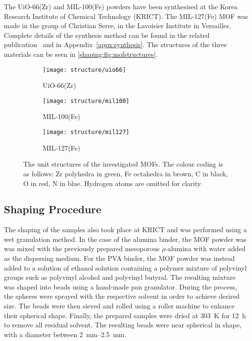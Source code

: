 The UiO-66(Zr) and MIL-100(Fe) powders have been synthesised at the
Korea Research Institute of Chemical Technology (KRICT).
The MIL-127(Fe) MOF was made in the group of Christian Serre,
in the Lavoisier Institute in Versailles.
Complete details of the synthesis method can be found in the related
publication~\cite{valekarShapingPorousMetal2017}
and in Appendix~\ref{appx:synthesis}.
The structures of the three materials can be seen
in \autoref{shaping:fig:mofstructures}.

\begin{figure}[htb]
	\centering
	\begin{subfigure}[b]{0.3\textwidth}
		\texttt{[image: structure/uio66]}
		\caption{UiO-66(Zr)}
	\end{subfigure}%
	\begin{subfigure}[b]{0.3\textwidth}
		\texttt{[image: structure/mil100]}
		\caption{MIL-100(Fe)}
	\end{subfigure}%
	\begin{subfigure}[b]{0.3\textwidth}
		\texttt{[image: structure/mil127]}
		\caption{MIL-127(Fe)}
	\end{subfigure}%

	\caption{The unit structures of the investigated MOFs.
		The colour coding is as follows: Zr polyhedra in green,
		Fe octahedra in brown, C in black, O in red, N in blue.
		Hydrogen atoms are omitted for clarity.}%
	\label{shaping:fig:mofstructures}
\end{figure}

\subsection{Shaping Procedure}

The shaping of the samples also took place at KRICT and was performed
using a wet granulation method. In the case of the alumina binder,
the MOF powder was was mixed with the previously prepared mesoporous
\(\rho\)-alumina with water added as the dispersing medium. For the
PVA binder, the MOF powder was instead added to a solution of
ethanol solution containing a polymer mixture of polyvinyl groups
such as polyvinyl alcohol and polyvinyl butyral. The resulting
mixture was shaped into beads using a hand-made pan granulator.
During the process, the spheres were sprayed with the respective
solvent in order to achieve desired size. The beads were then sieved
and rolled using a roller machine to enhance their spherical
shape. Finally, the prepared samples were dried at \SI{303}{\kelvin}
for \SI{12}{\hour} to remove all residual solvent.
The resulting beads were near spherical in shape, with a diameter
between \SIrange{2}{2.5}{\milli\metre}.

